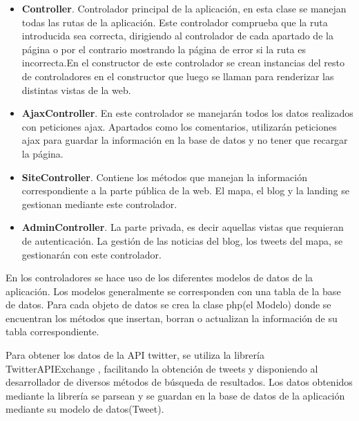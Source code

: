 \begin{itemize}

\item \textbf{Controller}. Controlador principal de la aplicación, en esta clase se manejan todas las rutas de la aplicación. Este controlador comprueba que la ruta introducida sea correcta, dirigiendo al controlador de cada apartado de la página o por el contrario mostrando la página de error si la ruta es incorrecta.En el constructor de este controlador se crean instancias del resto de controladores en el constructor que luego se llaman para renderizar las distintas vistas de la web.

\item \textbf{AjaxController}. En este controlador se manejarán todos los datos realizados con peticiones ajax. Apartados como los comentarios, utilizarán peticiones ajax para guardar la información en la base de datos y no tener que recargar la página.

\item \textbf{SiteController}. Contiene los métodos que manejan la información correspondiente a la parte pública de la web. El mapa, el blog y la landing se gestionan mediante este controlador.

\item \textbf{AdminController}. La parte privada, es decir aquellas vistas que requieran de autenticación. La gestión de las noticias del blog, los tweets del mapa, se gestionarán con este controlador. 

\end{itemize}


En los controladores se hace uso de los diferentes modelos de datos de la aplicación. Los modelos generalmente se corresponden con una tabla de la base de datos. Para cada objeto de datos se crea la clase php(el Modelo) donde se encuentran los métodos que insertan, borran o actualizan la información de su tabla correspondiente. 

\vspace{5 mm}

Para obtener los datos de la API twitter, se utiliza la librería TwitterAPIExchange \cite{tweet-framework}, facilitando la obtención de tweets y disponiendo al desarrollador de diversos métodos de búsqueda de resultados. Los datos obtenidos mediante la librería se parsean y se guardan en la base de datos de la aplicación mediante su modelo de datos(Tweet).

\vspace{5 mm}

